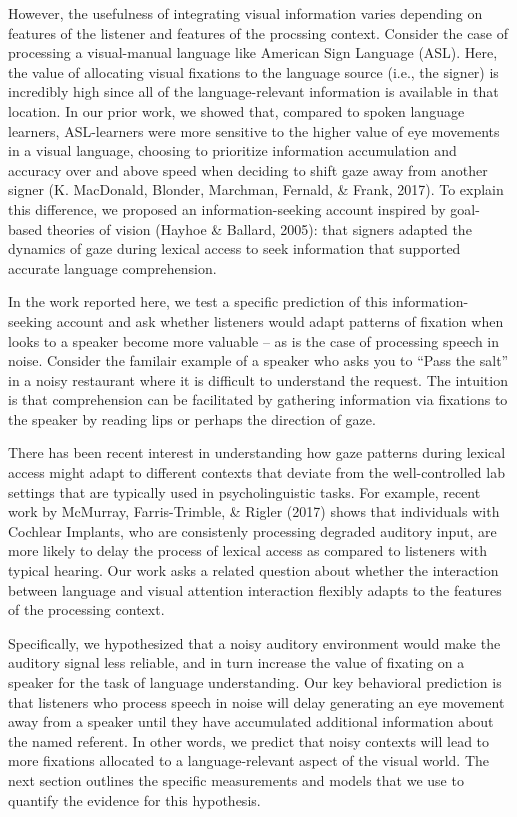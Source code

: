 \documentclass[10pt, letterpaper]{article}
\begin{document}
However, the usefulness of integrating visual information varies
depending on features of the listener and features of the procssing
context. Consider the case of processing a visual-manual language like
American Sign Language (ASL). Here, the value of allocating visual
fixations to the language source (i.e., the signer) is incredibly high
since all of the language-relevant information is available in that
location. In our prior work, we showed that, compared to spoken language
learners, ASL-learners were more sensitive to the higher value of eye
movements in a visual language, choosing to prioritize information
accumulation and accuracy over and above speed when deciding to shift
gaze away from another signer (K. MacDonald, Blonder, Marchman, Fernald,
\& Frank, 2017). To explain this difference, we proposed an
information-seeking account inspired by goal-based theories of vision
(Hayhoe \& Ballard, 2005): that signers adapted the dynamics of gaze
during lexical access to seek information that supported accurate
language comprehension.

In the work reported here, we test a specific prediction of this
information-seeking account and ask whether listeners would adapt
patterns of fixation when looks to a speaker become more valuable -- as
is the case of processing speech in noise. Consider the familair example
of a speaker who asks you to ``Pass the salt'' in a noisy restaurant
where it is difficult to understand the request. The intuition is that
comprehension can be facilitated by gathering information via fixations
to the speaker by reading lips or perhaps the direction of gaze.

There has been recent interest in understanding how gaze patterns during
lexical access might adapt to different contexts that deviate from the
well-controlled lab settings that are typically used in psycholinguistic
tasks. For example, recent work by McMurray, Farris-Trimble, \& Rigler
(2017) shows that individuals with Cochlear Implants, who are
consistenly processing degraded auditory input, are more likely to delay
the process of lexical access as compared to listeners with typical
hearing. Our work asks a related question about whether the interaction
between language and visual attention interaction flexibly adapts to the
features of the processing context.

Specifically, we hypothesized that a noisy auditory environment would
make the auditory signal less reliable, and in turn increase the value
of fixating on a speaker for the task of language understanding. Our key
behavioral prediction is that listeners who process speech in noise will
delay generating an eye movement away from a speaker until they have
accumulated additional information about the named referent. In other
words, we predict that noisy contexts will lead to more fixations
allocated to a language-relevant aspect of the visual world. The next
section outlines the specific measurements and models that we use to
quantify the evidence for this hypothesis.
\end{document}

